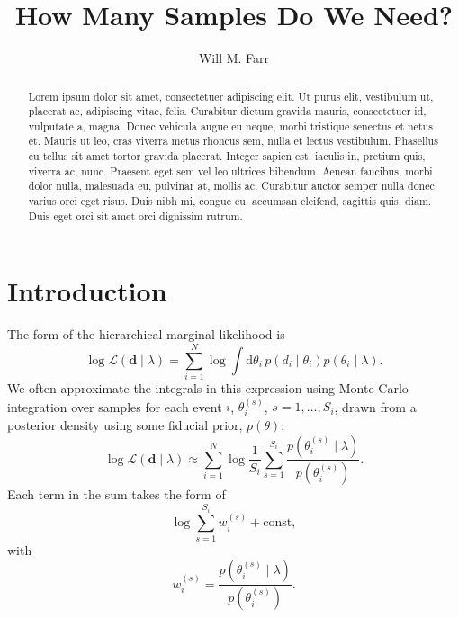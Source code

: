 \documentclass[modern]{aastex631}
\newcommand{\dd}{\mathrm{d}}
\begin{document}
\title{How Many Samples Do We Need?}

\author[0000-0003-1540-8562]{Will M. Farr}

\begin{abstract}
    Lorem ipsum dolor sit amet, consectetuer adipiscing elit.
    Ut purus elit, vestibulum ut, placerat ac, adipiscing vitae, felis.
    Curabitur dictum gravida mauris, consectetuer id, vulputate a, magna.
    Donec vehicula augue eu neque, morbi tristique senectus et netus et.
    Mauris ut leo, cras viverra metus rhoncus sem, nulla et lectus vestibulum.
    Phasellus eu tellus sit amet tortor gravida placerat.
    Integer sapien est, iaculis in, pretium quis, viverra ac, nunc.
    Praesent eget sem vel leo ultrices bibendum.
    Aenean faucibus, morbi dolor nulla, malesuada eu, pulvinar at, mollis ac.
    Curabitur auctor semper nulla donec varius orci eget risus.
    Duis nibh mi, congue eu, accumsan eleifend, sagittis quis, diam.
    Duis eget orci sit amet orci dignissim rutrum.
\end{abstract}

\section{Introduction}
\label{sec:intro}

The form of the hierarchical marginal likelihood is 
\begin{equation}
    \log \mathcal{L}\left( \mathbf{d} \mid \lambda \right) = \sum_{i=1}^{N} \log \int \dd \theta_i \, p\left( d_i \mid \theta_i \right) p\left( \theta_i \mid \lambda \right).
\end{equation}
We often approximate the integrals in this expression using Monte Carlo
integration over samples for each event $i$, $\theta_{i}^{(s)}$, $s = 1, \ldots,
S_i$, drawn from a posterior density using some fiducial prior, $p\left( \theta
\right)$:
\begin{equation}
    \log \mathcal{L}\left( \mathbf{d} \mid \lambda \right) \approx \sum_{i=1}^{N} \log \frac{1}{S_i} \sum_{s=1}^{S_i} \frac{p\left( \theta_i^{(s)} \mid \lambda \right)}{p\left( \theta_i^{(s)} \right)} .
\end{equation}
Each term in the sum takes the form of 
\begin{equation}
    \log \sum_{s=1}^{S_i} w_i^{(s)} + \mathrm{const},
\end{equation}
with 
\begin{equation}
    w_i^{(s)} = \frac{p\left( \theta_i^{(s)} \mid \lambda \right)}{p\left( \theta_i^{(s)} \right)}.
\end{equation}
\end{document}
